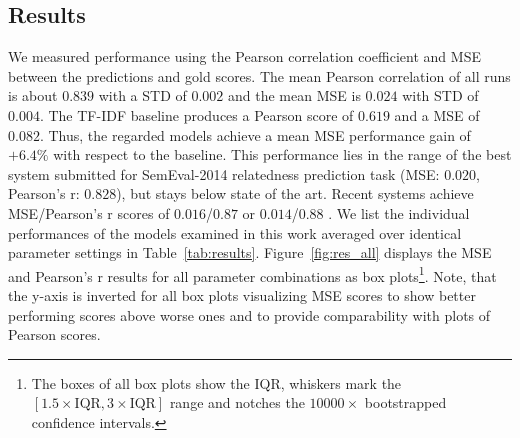\subsection{Results}
We measured performance using the Pearson correlation coefficient and \ac{MSE} between the predictions and gold scores. The mean Pearson correlation of all runs is about $0.839$ with a \ac{STD} of $0.002$ and the mean \ac{MSE} is $0.024$ with \ac{STD} of $0.004$. The \ac{TF-IDF} baseline produces a Pearson score of $0.619$ and a \ac{MSE} of $0.082$. Thus, the regarded models achieve a mean \ac{MSE} performance gain of $+6.4\%$ with respect to the baseline. This performance lies in the range of the best system submitted for SemEval-2014 relatedness prediction task (MSE: $0.020$, Pearson's r: $0.828$), but stays below state of the art. Recent systems achieve MSE/Pearson's r scores of $0.016$/$0.87$ \autocite{he_multi-perspective_2015} or $0.014$/$0.88$ \autocite{mueller_siamese_2016}. We list the individual performances of the models examined in this work averaged over identical parameter settings in Table~\ref{tab:results}. Figure~\ref{fig:res_all} displays the \ac{MSE} and Pearson's r results for all parameter combinations as box plots\footnote{The boxes of all box plots show the \ac{IQR}, whiskers mark the $[1.5\times \text{IQR}, 3\times \text{IQR}]$ range and notches the  $10000\times$ bootstrapped confidence intervals.}. Note, that the y-axis is inverted for all box plots visualizing \ac{MSE} scores to show better performing scores above worse ones and to provide comparability with plots of Pearson scores. 




